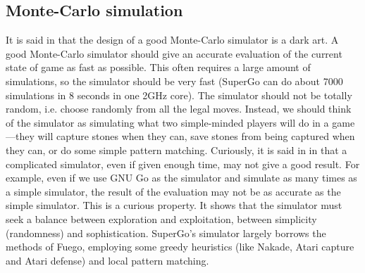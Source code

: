 \subsection{Monte-Carlo simulation}
It is said in \cite{chaslot_combiningexpert} that the design of a good Monte-Carlo simulator is a dark art. A good Monte-Carlo simulator should give an accurate evaluation of the current state of game as fast as possible. This often requires a large amount of simulations, so the simulator should be very fast (SuperGo can do about 7000 simulations in 8 seconds in one 2GHz core). The simulator should not be totally random, i.e. choose randomly from all the legal moves. Instead, we should think of the simulator as simulating what two simple-minded players will do in a game---they will capture stones when they can, save stones from being captured when they can, or do some simple pattern matching. Curiously, it is said in in \cite{chaslot_combiningexpert} that a complicated simulator, even if given enough time, may not give a good result. For example, even if we use GNU Go as the simulator and simulate as many times as a simple simulator, the result of the evaluation may not be as accurate as the simple simulator. This is a curious property. It shows that the simulator must seek a balance between exploration and exploitation, between simplicity (randomness) and sophistication. SuperGo's simulator largely borrows the methods of Fuego\cite{grace2010fuego}, employing some greedy heuristics (like Nakade, Atari capture and Atari defense) and local pattern matching.

